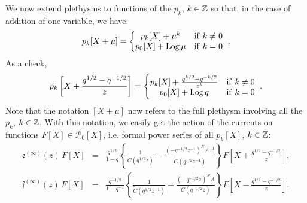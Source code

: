 We now extend plethysms to functions of the $p_k$, $k\in {\mathbb Z}$ so that, in the case of addition of one variable,
we have:
$$p_k[X+\mu]=\left\{ \begin{matrix} 
p_k[X]+\mu^k & {\rm if}\ k\neq 0\\
p_0[X]+{\rm Log}\, \mu & {\rm if}\  k=0
\end{matrix} \right. \ .$$
As a check, 
$$p_k\left[X+\frac{q^{1/2}-q^{-1/2}}{z}\right]=\left\{ \begin{matrix} 
p_k[X]+\frac{q^{k/2}-q^{-k/2}}{z^k}  & {\rm if}\ k\neq 0\\
p_0[X]+{\rm Log}\, q & {\rm if}\  k=0
\end{matrix} \right. \ .$$
Note that the notation $\left[X+\mu \right]$ now refers to the full plethysm involving all the $p_k$, $k\in {\mathbb Z}$.
With this notation, we easily get the action of the currents on functions 
$F[X]\in {\mathcal P}_0[X]$, i.e. formal power series of all 
$p_k[X]$, $k\in {\mathbb Z}$:
\begin{eqnarray*}
{\mathfrak e}^{(\infty)}(z)\, F[X]&=&\frac{q^{1/2}}{1-q} \left\{
\frac{1}{C(q^{1/2}z)}- 
\frac{(-q^{-1/2}z^{-1})^N A^{-1}}{{\widetilde C}(q^{1/2}z^{-1})}\right\} 
F\left[X+\frac{q^{1/2}-q^{-1/2}}{z} \right], \nonumber \\
{\mathfrak f}^{(\infty)}(z)\, F[X]&=&\frac{q^{-1/2}}{1-q^{-1}} \left\{
\frac{1}{{\widetilde C}(q^{1/2}z^{-1})}- 
\frac{(-q^{-1/2}z )^N A}{C(q^{-1/2}z)}\right\} 
F\left[X-\frac{q^{1/2}-q^{-1/2}}{z} \right]. \nonumber
\end{eqnarray*}




